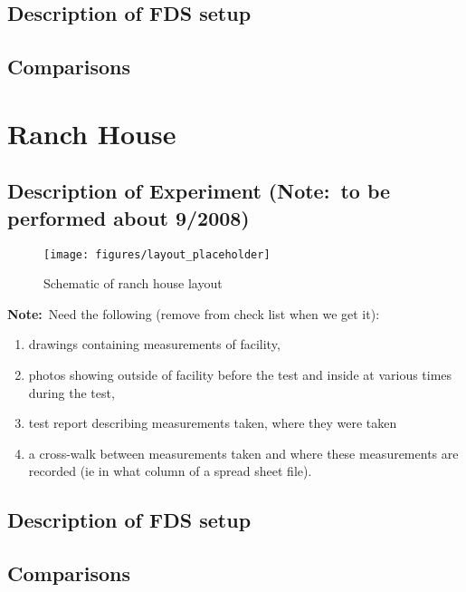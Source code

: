 \documentclass[11pt]{book}
\newcommand{\note}{{\bf Note:}}
\begin{document}
\section{Description of FDS setup}


\section{Comparisons}


\chapter{Ranch House}

\section{Description of Experiment (\note\ to be performed about 9/2008)}
\begin{figure}[\figoptions]
\begin{center}
\texttt{[image: figures/layout\_placeholder]}
\end{center}
\caption {Schematic of ranch house layout}
\label{figMCFRStrainer}%
\end{figure}

\note\ Need the following (remove from check list when we get it):
\begin{enumerate}
\item drawings containing measurements of facility,
\item photos showing outside of facility before the test and inside at various times during the test,
\item test report describing
measurements taken, where they were taken
\item a cross-walk between measurements taken and where these measurements are recorded (ie
in what column of a spread sheet file).
\end{enumerate}

\section{Description of FDS setup}


\section{Comparisons}
\end{document}
